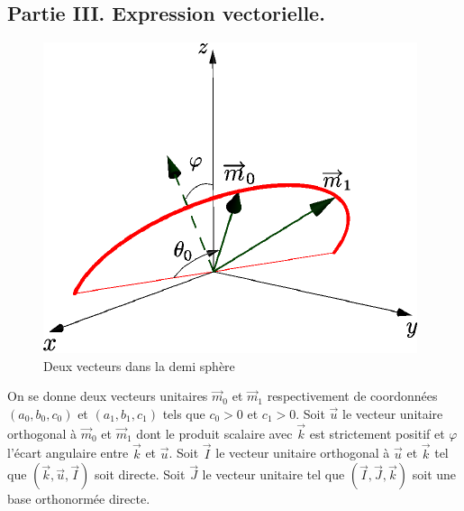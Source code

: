 \subsection*{Partie III. Expression vectorielle.}
\begin{figure}[h!t]
 \centering
 \includegraphics{./Eintcurv_4.pdf}
 \caption{Deux vecteurs dans la demi sphère}
 \label{fig:Eintcurv_4}
\end{figure}
On se donne deux vecteurs unitaires $\overrightarrow{m}_0$ et $\overrightarrow{m}_1$ respectivement de coordonnées $(a_0,b_0,c_0)$ et $(a_1,b_1,c_1)$ tels que $c_0>0$ et $c_1>0$.\newline
Soit $\overrightarrow{u}$ le vecteur unitaire orthogonal à $\overrightarrow{m}_0$ et $\overrightarrow{m}_1$ dont le produit scalaire avec $\overrightarrow{k}$ est strictement positif et $\varphi$ l'écart angulaire entre $\overrightarrow{k}$ et $\overrightarrow{u}$.\newline
Soit $\overrightarrow{I}$ le vecteur unitaire orthogonal à $\overrightarrow{u}$ et $\overrightarrow{k}$ tel que $(\overrightarrow{k},\overrightarrow{u},\overrightarrow{I})$ soit directe.\newline
Soit $\overrightarrow{J}$ le vecteur unitaire tel que $(\overrightarrow{I},\overrightarrow{J},\overrightarrow{k})$ soit une base orthonormée directe.

